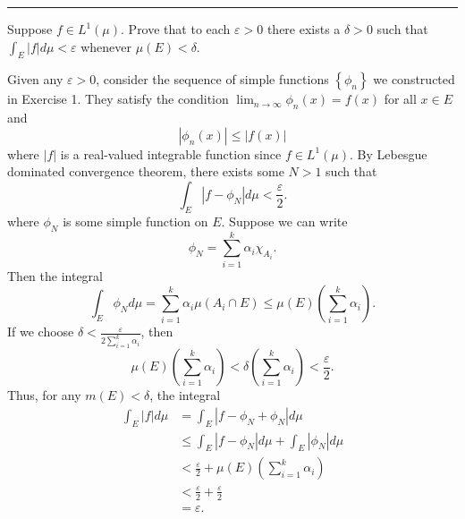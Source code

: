 \documentclass[letterpaper, 12pt]{article}
\begin{document}
\noindent\rule{7in}{2.8pt}
\begin{problem}{1.12}
Suppose \(f\in L^1(\mu)\). Prove that to each \(\varepsilon>0\) there exists a \(\delta>0\) such that \(\int_E|f|d\mu<\varepsilon\) whenever \(\mu(E)<\delta\). 
\end{problem}
\begin{solution}
Given any \(\varepsilon>0\), consider the sequence of simple functions \(\left\{ \phi_n \right\}\) we constructed in Exercise 1. They satisfy the condition \(\lim_{n\to \infty}\phi_n(x)=f(x)\) for all \(x\in E\) and 
\[|\phi_n(x)|\leq |f(x)|\]
where \(|f|\) is a real-valued integrable function since \(f\in L^1(\mu)\). By Lebesgue dominated convergence theorem, there exists some \(N>1\) such that 
\[\int_E |f-\phi_N|d\mu<\frac{\varepsilon}{2}.\]
where \(\phi_N\) is some simple function on \(E\). Suppose we can write 
\[\phi_N=\sum_{i=1}^{k}\alpha_i \chi_{A_i}.\]
Then the integral 
\[\int_E \phi_Nd\mu=\sum_{i=1}^{k}\alpha_i\mu(A_i\cap E)\leq \mu(E)(\sum_{i=1}^{k}\alpha_i).\] 
If we choose \(\delta<\frac{\varepsilon}{2\sum_{i=1}^{k}\alpha_i}\), then 
\[\mu(E)(\sum_{i=1}^{k}\alpha_i)<\delta(\sum_{i=1}^{k}\alpha_i)<\frac{\varepsilon}{2}.\]
Thus, for any \(m(E)<\delta\), the integral 
\begin{align*}
     \int_E |f|d\mu&=\int_E|f-\phi_N+\phi_N|d\mu\\
                   &\leq \int_E |f-\phi_N|d\mu +\int_E|\phi_N|d\mu\\
                   &< \frac{\varepsilon}{2}+\mu(E)(\sum_{i=1}^{k}\alpha_i)\\
                   &<\frac{\varepsilon}{2}+\frac{\varepsilon}{2}\\
                   &=\varepsilon.
\end{align*}
\end{solution}
\end{document}
